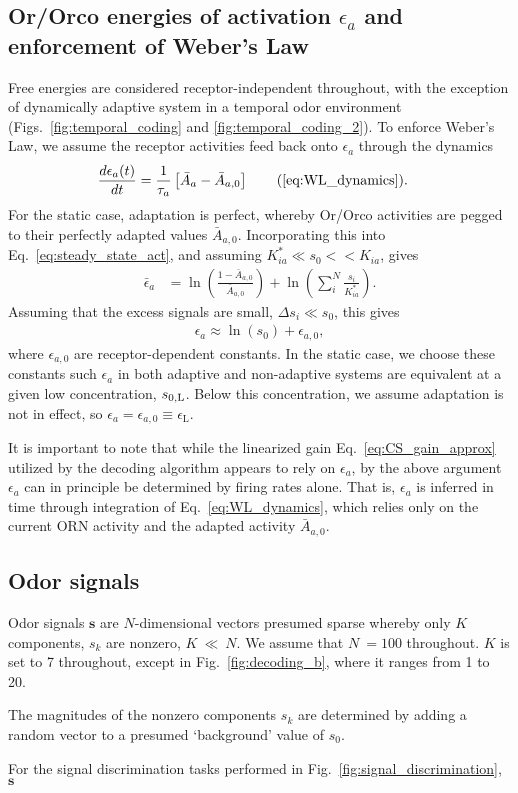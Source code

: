\subsection{Or/Orco  energies of activation $\epsilon_a$ and enforcement of Weber's Law}
Free energies are considered receptor-independent throughout, with the exception of dynamically adaptive system in a temporal odor environment (Figs.~\ref{fig:temporal_coding} and \ref{fig:temporal_coding_2}). To enforce Weber's Law, we assume the receptor activities feed back onto $\epsilon_a$ through the dynamics
\begin{align}
\frac{d\epsilon_a(t)}{dt} &= \frac{1}{\tau_a}\left[\bar{A}_a - \bar {A}_{a,0}\right] \tag{\ref{eq:WL_dynamics}}.
\end{align}
For the static case, adaptation is perfect, whereby Or/Orco activities are pegged to their perfectly adapted values $\bar {A}_{a,0}$. Incorporating this into Eq.~\ref{eq:steady_state_act}, and assuming  $K^*_{ia} \ll s_0 << K_{ia}$, gives
\begin{align}
\bar \epsilon_a &= \ln\left(\frac{1-\bar {A}_{a,0}}{\bar {A}_{a,0}}\right) + \ln\left(\sum_i^N\frac{s_i}{K_{ia}^*}\right).
\label{eq:adapted_epsilon}
\end{align}
Assuming that the excess signals are small, $\Delta s_i \ll s_0$, this gives 
\begin{align}
\epsilon_a \approx \ln(s_0) + \epsilon_{a, 0},
\label{eq:WL_approx}
\end{align} 
where $\epsilon_{a, 0}$ are receptor-dependent constants. In the static case, we choose these constants such $\epsilon_{a}$ in both adaptive and non-adaptive systems are equivalent at a given low concentration, $s_{0, \text L}$.  Below this concentration, we assume adaptation is not in effect, so $\epsilon_a = \epsilon_{a, 0} \equiv \epsilon_{\text {L}}$. 

It is important to note that while the linearized gain Eq.~\ref{eq:CS_gain_approx} utilized by the decoding algorithm appears to rely on $\epsilon_a$, by the above argument $\epsilon_a$ can in principle be determined by firing rates alone. That is, $\epsilon_a$ is inferred in time through integration of Eq.~\ref{eq:WL_dynamics}, which relies only on the current ORN activity and the adapted activity $\bar{A}_{a, 0}$. 


\subsection{Odor signals}
Odor signals $\mathbf s$ are $N$-dimensional vectors presumed sparse whereby only $K$ components, $s_k$ are nonzero,  $K~\ll~N$. We assume that $N~=100$ throughout. $K$ is set to 7 throughout, except in Fig.~\ref{fig:decoding_b}, where it ranges from 1 to 20. 

The magnitudes of the nonzero components $s_k$ are determined by adding a random vector to a presumed `background' value of $s_0$. 


For the signal discrimination tasks performed in Fig.~\ref{fig:signal_discrimination}, $\mathbf s$

